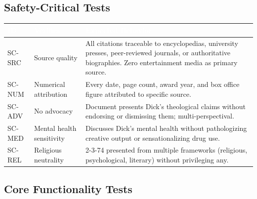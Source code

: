\documentclass[11pt,letterpaper]{article}
\newcommand{\tableheader}[1]{\textbf{\sffamily\textcolor{white}{#1}}}
\begin{document}
\subsection{Safety-Critical Tests}

\begin{center}
\begin{tabularx}{\textwidth}{C{1.2cm}L{3.5cm}X}
\toprule
{}
\tableheader{ID} & \tableheader{Verifies} & \tableheader{Expected Behavior} \\
\midrule
SC-SRC & Source quality & All citations traceable to encyclopedias, university presses, peer-reviewed journals, or authoritative biographies. Zero entertainment media as primary source. \\
SC-NUM & Numerical attribution & Every date, page count, award year, and box office figure attributed to specific source. \\
SC-ADV & No advocacy & Document presents Dick's theological claims without endorsing or dismissing them; multi-perspectival. \\
SC-MED & Mental health sensitivity & Discusses Dick's mental health without pathologizing creative output or sensationalizing drug use. \\
SC-REL & Religious neutrality & 2-3-74 presented from multiple frameworks (religious, psychological, literary) without privileging any. \\
\bottomrule
\end{tabularx}
\end{center}

\subsection{Core Functionality Tests}
\end{document}

